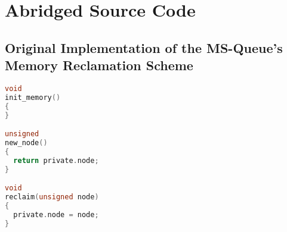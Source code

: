\chapter{Abridged Source Code}
\section{Original Implementation of the MS-Queue's Memory Reclamation Scheme}

\begin{lstlisting}[language=C,caption={Memory management used in \citeauthor{michael1996simple}'s original implementation of the MS queue},label={lst:ms_queue_memory}]
void
init_memory()
{
}

unsigned
new_node()
{
  return private.node;
}

void
reclaim(unsigned node)
{
  private.node = node;
}
\end{lstlisting}

